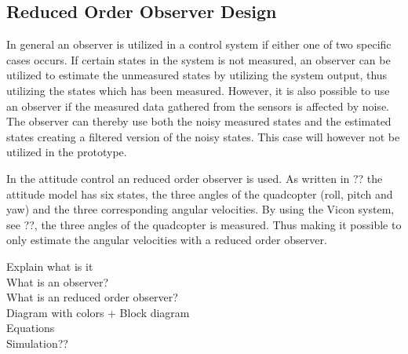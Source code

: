 \subsection{Reduced Order Observer Design}

In general an observer is utilized in a control system if either one of two specific cases occurs. If certain states in the system is not measured, an observer can be utilized to estimate the unmeasured states by utilizing the system output, thus utilizing the states which has been measured. However, it is also possible to use an observer if the measured data gathered from the sensors is affected by noise. The observer can thereby use both the noisy measured states and the estimated states creating a filtered version of the noisy states. This case will however not be utilized in the prototype.

In the attitude control an reduced order observer is used. As written in ?? the attitude model has six states, the three angles of the quadcopter (roll, pitch and yaw) and the three corresponding angular velocities. By using the Vicon system, see ??, the three angles of the quadcopter is measured. Thus making it possible to only estimate the angular velocities with a reduced order observer. 



Explain what is it\\
	What is an observer?\\
	
	What is an reduced order observer?\\
Diagram with colors + Block diagram\\
Equations\\
Simulation??\\



